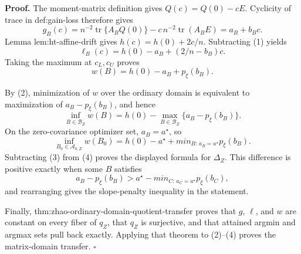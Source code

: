 \textbf{Proof.}
The moment-matrix definition gives \(Q(c)=Q(0)-cE\).  Cyclicity of trace in def:gain-loss therefore gives
\[
g_B(c)=n^{-2}\operatorname{tr}\{A_BQ(0)\}
-c\,n^{-2}\operatorname{tr}(A_BE)=a_B+b_Bc. \tag{1}
\]
Lemma lem:ht-affine-drift gives \(h(c)=h(0)+2c/n\).  Subtracting (1) yields
\[
\ell_B(c)=h(0)-a_B+(2/n-b_B)c.
\]
Taking the maximum at \(c_L,c_U\) proves
\[
w(B)=h(0)-a_B+p_\xi(b_B). \tag{2}
\]

By (2), minimization of \(w\) over the ordinary domain is equivalent to maximization of \(a_B-p_\xi(b_B)\), and hence
\[
\inf_{B\in\mathcal B_Z}w(B)
=h(0)-\max_{B\in\mathcal B_Z}\{a_B-p_\xi(b_B)\}. \tag{3}
\]
On the zero-covariance optimizer set, \(a_B=a^\star\), so
\[
\inf_{B_0\in\mathcal A_{0,Z}}w(B_0)
=h(0)-a^\star+min_{B:\,a_B=a^\star}p_\xi(b_B). \tag{4}
\]
Subtracting (3) from (4) proves the displayed formula for \(\Delta_Z\).  This difference is positive exactly when some \(B\) satisfies
\[
a_B-p_\xi(b_B)>a^\star-min_{C:\,a_C=a^\star}p_\xi(b_C),
\]
and rearranging gives the slope-penalty inequality in the statement.

Finally, thm:zhao-ordinary-domain-quotient-transfer proves that \(g\), \(\ell\), and \(w\) are constant on every fiber of \(q_Z\), that \(q_Z\) is surjective, and that attained argmin and argmax sets pull back exactly.  Applying that theorem to (2)--(4) proves the matrix-domain transfer. \(\square\)